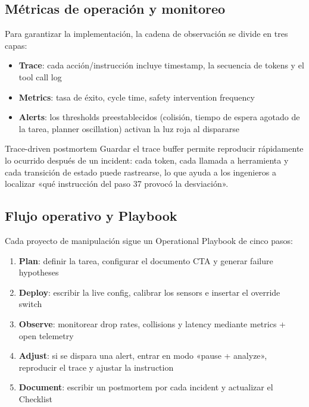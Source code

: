 \documentclass[a4paper]{article}
\begin{document}
\subsection{Métricas de operación y monitoreo}

Para garantizar la implementación, la cadena de observación se divide en tres capas:

\begin{itemize}
    \item \textbf{Trace}: cada acción/instrucción incluye timestamp, la secuencia de tokens y el tool call log
    \item \textbf{Metrics}: tasa de éxito, cycle time, safety intervention frequency
    \item \textbf{Alerts}: los thresholds preestablecidos (colisión, tiempo de espera agotado de la tarea, planner oscillation) activan la luz roja al dispararse
\end{itemize}

\begin{knowledgebox}{Trace-driven postmortem}
Guardar el trace buffer permite reproducir rápidamente lo ocurrido después de un incident: cada token, cada llamada a herramienta y cada transición de estado puede rastrearse, lo que ayuda a los ingenieros a localizar «qué instrucción del paso 37 provocó la desviación».
\end{knowledgebox}

\subsection{Flujo operativo y Playbook}

Cada proyecto de manipulación sigue un Operational Playbook de cinco pasos:

\begin{enumerate}
    \item \textbf{Plan}: definir la tarea, configurar el documento CTA y generar failure hypotheses
    \item \textbf{Deploy}: escribir la live config, calibrar los sensors e insertar el override switch
    \item \textbf{Observe}: monitorear drop rates, collisions y latency mediante metrics + open telemetry
    \item \textbf{Adjust}: si se dispara una alert, entrar en modo «pause + analyze», reproducir el trace y ajustar la instruction
    \item \textbf{Document}: escribir un postmortem por cada incident y actualizar el Checklist
\end{enumerate}
\end{document}
